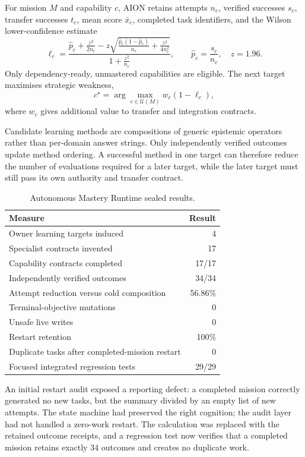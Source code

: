 For mission $M$ and capability $c$, AION retains attempts $n_c$, verified
successes $s_c$, transfer successes $t_c$, mean score $\bar{x}_c$, completed
task identifiers, and the Wilson lower-confidence estimate
\begin{equation}
\ell_c=
\frac{
\hat{p}_c+\frac{z^2}{2n_c}
-z\sqrt{\frac{\hat{p}_c(1-\hat{p}_c)}{n_c}+\frac{z^2}{4n_c^2}}
}{1+\frac{z^2}{n_c}},
\qquad
\hat{p}_c=\frac{s_c}{n_c},\quad z=1.96.
\label{eq:mastery-confidence}
\end{equation}
Only dependency-ready, unmastered capabilities are eligible.  The next target
maximises strategic weakness,
\begin{equation}
c^{\star}=\arg\max_{c\in\mathcal{U}(M)}
w_c(1-\ell_c),
\end{equation}
where $w_c$ gives additional value to transfer and integration contracts.

Candidate learning methods are compositions of generic epistemic operators
rather than per-domain answer strings.  Only independently verified outcomes
update method ordering.  A successful method in one target can therefore
reduce the number of evaluations required for a later target, while the later
target must still pass its own authority and transfer contract.

\begin{table}[htbp]
\centering
\caption{Autonomous Mastery Runtime sealed results.}
\label{tab:autonomous-mastery-results}
\begin{tabular}{@{}lr@{}}
\toprule
Measure & Result \\
\midrule
Owner learning targets induced & 4 \\
Specialist contracts invented & 17 \\
Capability contracts completed & 17/17 \\
Independently verified outcomes & 34/34 \\
Attempt reduction versus cold composition & 56.86\% \\
Terminal-objective mutations & 0 \\
Unsafe live writes & 0 \\
Restart retention & 100\% \\
Duplicate tasks after completed-mission restart & 0 \\
Focused integrated regression tests & 29/29 \\
\bottomrule
\end{tabular}
\end{table}

An initial restart audit exposed a reporting defect: a completed mission
correctly generated no new tasks, but the summary divided by an empty list of
new attempts.  The state machine had preserved the right cognition; the audit
layer had not handled a zero-work restart.  The calculation was replaced with
the retained outcome receipts, and a regression test now verifies that a
completed mission retains exactly 34 outcomes and creates no duplicate work.

